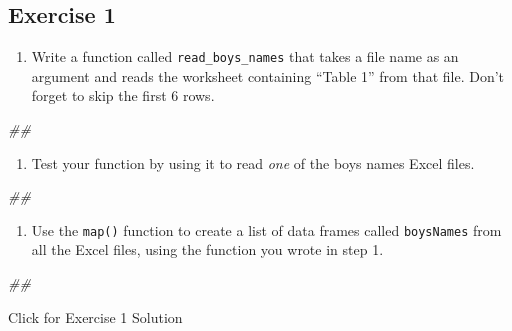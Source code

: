 \documentclass[
]{book}
\newenvironment{Shaded}{\begin{snugshade}}{\end{snugshade}}
\newcommand{\CommentTok}[1]{\textcolor[rgb]{0.56,0.35,0.01}{\textit{#1}}}
\providecommand{\tightlist}{%
  \setlength{\itemsep}{0pt}\setlength{\parskip}{0pt}}
\begin{document}
\hypertarget{exercise-1-3}{%
\subsection{Exercise 1}\label{exercise-1-3}}

\begin{enumerate}
\def\labelenumi{\arabic{enumi}.}
\tightlist
\item
  Write a function called \texttt{read\_boys\_names} that takes a file name as an argument and reads the worksheet containing ``Table 1'' from that file. Don't forget to skip the first 6 rows.
\end{enumerate}

\begin{Shaded}
\begin{Highlighting}[]
\CommentTok{\#\# }
\end{Highlighting}
\end{Shaded}

\begin{enumerate}
\def\labelenumi{\arabic{enumi}.}
\setcounter{enumi}{1}
\tightlist
\item
  Test your function by using it to read \emph{one} of the boys names Excel files.
\end{enumerate}

\begin{Shaded}
\begin{Highlighting}[]
\CommentTok{\#\# }
\end{Highlighting}
\end{Shaded}

\begin{enumerate}
\def\labelenumi{\arabic{enumi}.}
\setcounter{enumi}{2}
\tightlist
\item
  Use the \texttt{map()} function to create a list of data frames called \texttt{boysNames} from all the Excel files, using the function you wrote in step 1.
\end{enumerate}

\begin{Shaded}
\begin{Highlighting}[]
\CommentTok{\#\# }
\end{Highlighting}
\end{Shaded}

{Click for Exercise 1 Solution}
\end{document}
